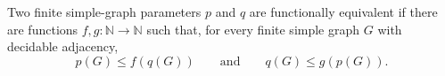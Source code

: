 Two finite simple-graph parameters \(p\) and \(q\) are functionally
equivalent if there are functions \(f,g:\mathbb{N}\to\mathbb{N}\) such that,
for every finite simple graph \(G\) with decidable adjacency,
\[
  p(G)\le f(q(G))
  \qquad\text{and}\qquad
  q(G)\le g(p(G)).
\]
